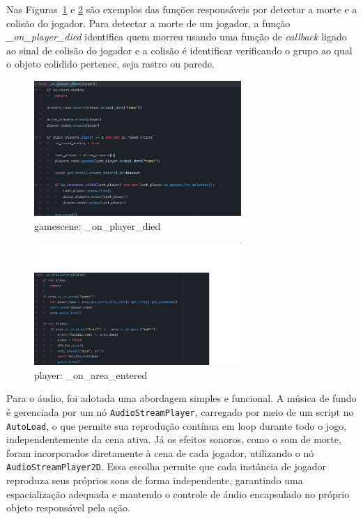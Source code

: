 Nas Figuras~\ref{fig:on_player_died} e \ref{fig:player_area_func} são exemplos das funções responsáveis por detectar a morte e a colisão do jogador. Para detectar a morte de um jogador, a função \textit{\_on\_player\_died} identifica quem morreu usando uma função de \textit{callback} ligado ao sinal de colisão do jogador e a colisão é identificar verificando o grupo ao qual o objeto colidido pertence, seja rastro ou parede.

\begin{figure}[htbp]
    \centering
    \caption{gamescene: \_on\_player\_died}
    \label{fig:on_player_died}
    \includegraphics[width=0.7\textwidth]{figuras/game_body.png}
\end{figure}

\begin{figure}[htbp]
    \centering
    \caption{player: \_on\_area\_entered}
    \label{fig:player_area_func}
    \includegraphics[width=0.7\textwidth]{figuras/player_body.png}
\end{figure}

Para o áudio, foi adotada uma abordagem simples e funcional. A música de fundo é gerenciada por um nó \texttt{AudioStreamPlayer}, carregado por meio de um script no \texttt{AutoLoad}, o que permite sua reprodução contínua em loop durante todo o jogo, independentemente da cena ativa. Já os efeitos sonoros, como o som de morte, foram incorporados diretamente à cena de cada jogador, utilizando o nó \texttt{AudioStreamPlayer2D}. Essa escolha permite que cada instância de jogador reproduza seus próprios sons de forma independente, garantindo uma espacialização adequada e mantendo o controle de áudio encapsulado no próprio objeto responsável pela ação.

